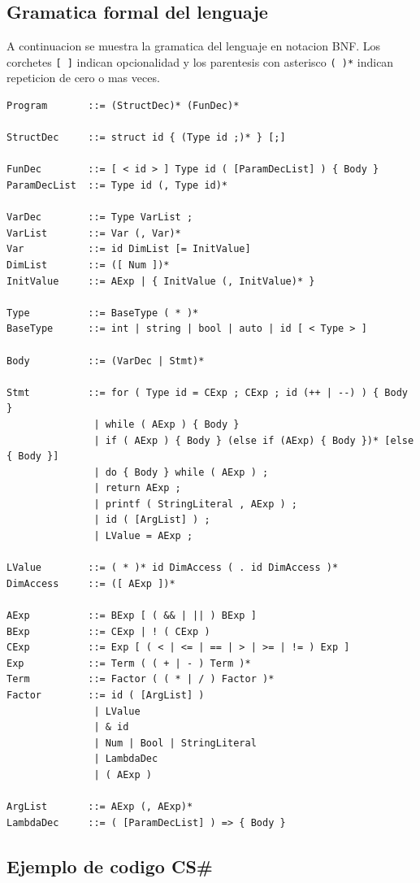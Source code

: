 \documentclass[12pt, a4paper]{article}
\begin{document}
\subsection{Gramatica formal del lenguaje}

A continuacion se muestra la gramatica del lenguaje en notacion BNF. Los corchetes \texttt{[ ]} indican opcionalidad y los parentesis con asterisco \texttt{( )*} indican repeticion de cero o mas veces.

\begin{lstlisting}[style=grammarstyle, caption={Gramatica completa de CS\#}]
Program       ::= (StructDec)* (FunDec)*

StructDec     ::= struct id { (Type id ;)* } [;]

FunDec        ::= [ < id > ] Type id ( [ParamDecList] ) { Body }
ParamDecList  ::= Type id (, Type id)*

VarDec        ::= Type VarList ;
VarList       ::= Var (, Var)*
Var           ::= id DimList [= InitValue]
DimList       ::= ([ Num ])*
InitValue     ::= AExp | { InitValue (, InitValue)* }

Type          ::= BaseType ( * )*
BaseType      ::= int | string | bool | auto | id [ < Type > ]

Body          ::= (VarDec | Stmt)*

Stmt          ::= for ( Type id = CExp ; CExp ; id (++ | --) ) { Body }
               | while ( AExp ) { Body }
               | if ( AExp ) { Body } (else if (AExp) { Body })* [else { Body }]
               | do { Body } while ( AExp ) ;
               | return AExp ;
               | printf ( StringLiteral , AExp ) ;
               | id ( [ArgList] ) ;
               | LValue = AExp ;

LValue        ::= ( * )* id DimAccess ( . id DimAccess )*
DimAccess     ::= ([ AExp ])*

AExp          ::= BExp [ ( && | || ) BExp ]
BExp          ::= CExp | ! ( CExp )
CExp          ::= Exp [ ( < | <= | == | > | >= | != ) Exp ]
Exp           ::= Term ( ( + | - ) Term )*
Term          ::= Factor ( ( * | / ) Factor )*
Factor        ::= id ( [ArgList] )
               | LValue
               | & id
               | Num | Bool | StringLiteral
               | LambdaDec
               | ( AExp )

ArgList       ::= AExp (, AExp)*
LambdaDec     ::= ( [ParamDecList] ) => { Body }
\end{lstlisting}

\subsection{Ejemplo de codigo CS\#}
\end{document}
